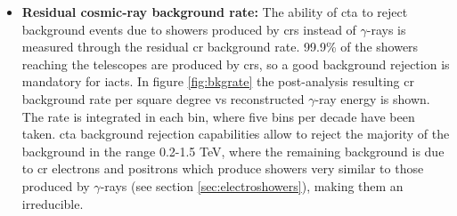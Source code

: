\documentclass[main.tex]{subfiles}
\begin{document}
\begin{itemize}
\item \textbf{Residual cosmic-ray background rate:} The ability of \gls{cta} to reject background events due to showers produced by \glspl{cr} instead of $\gamma$-rays is measured through the residual \gls{cr} background rate. 99.9\% of the showers reaching the telescopes are produced by \glspl{cr}, so a good background rejection is mandatory for \glspl{iact}. In figure \ref{fig:bkgrate} the post-analysis resulting \gls{cr} background rate per square degree vs reconstructed $\gamma$-ray energy is shown. The rate is integrated in each bin, where five bins per decade have been taken. \gls{cta} background rejection capabilities allow to reject the majority of the background in the range 0.2-1.5 TeV, where the remaining background is due to \gls{cr} electrons and positrons \cite{2017ICRCCTAPerformance} which produce showers very similar to those produced by $\gamma$-rays (see section \ref{sec:electroshowers}), making them an irreducible.


\end{itemize}
\end{document}
